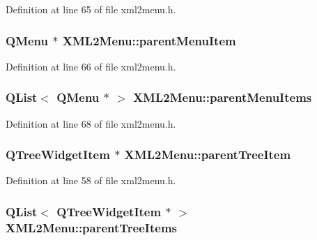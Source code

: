 Definition at line 65 of file xml2menu.h.

\hypertarget{classXML2Menu_a502707dcd0dde7d0b74b33cb0e03bd9a}{
\subsubsection[{parentMenuItem}]{\setlength{\rightskip}{0pt plus 5cm}QMenu $\ast$ {\bf XML2Menu::parentMenuItem}}}
\label{classXML2Menu_a502707dcd0dde7d0b74b33cb0e03bd9a}


Definition at line 66 of file xml2menu.h.

\hypertarget{classXML2Menu_a1f7a54c39f5f96f607d6bc9acdba422e}{
\subsubsection[{parentMenuItems}]{\setlength{\rightskip}{0pt plus 5cm}QList$<$ QMenu $\ast$ $>$ {\bf XML2Menu::parentMenuItems}}}
\label{classXML2Menu_a1f7a54c39f5f96f607d6bc9acdba422e}


Definition at line 68 of file xml2menu.h.

\hypertarget{classXML2Menu_a165191c6389fde7fb84b297d55b39637}{
\subsubsection[{parentTreeItem}]{\setlength{\rightskip}{0pt plus 5cm}QTreeWidgetItem $\ast$ {\bf XML2Menu::parentTreeItem}}}
\label{classXML2Menu_a165191c6389fde7fb84b297d55b39637}


Definition at line 58 of file xml2menu.h.

\hypertarget{classXML2Menu_a236e5e92260fd3f5e3442770cd830325}{
\subsubsection[{parentTreeItems}]{\setlength{\rightskip}{0pt plus 5cm}QList$<$ QTreeWidgetItem $\ast$ $>$ {\bf XML2Menu::parentTreeItems}}}
\label{classXML2Menu_a236e5e92260fd3f5e3442770cd830325}


